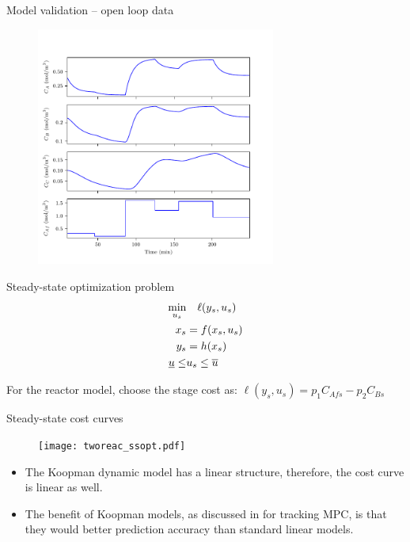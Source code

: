 \documentclass[xcolor=dvipsnames, 8pt]{beamer} %
\begin{document}
\begin{frame}{Model validation -- open loop data}
	\vspace{-0.1in}
	\begin{figure}
		\centering
		\includegraphics[page=1, height=0.8\textheight, 
		width=0.7\textwidth]{tworeac_plots.pdf}
	\end{figure}
\end{frame}

\begin{frame}{Steady-state optimization problem}
	\begin{align*}
	\underset{u_s}{\textnormal{min}} & \quad \ell(y_s, u_s) \\
	x_s &= f(x_s, u_s) \nonumber \\ 
	y_s &= h(x_s) \nonumber \\
	\underline{u} \leq &u_s \leq \overline{u} \nonumber
	\end{align*}
	
	For the reactor model, choose the stage cost as: $\ell(y_s, u_s) = 
	p_1C_{Afs} - p_2C_{Bs}$
	
\end{frame}

\begin{frame}{Steady-state cost curves}
	\begin{figure}
		\centering
		\texttt{[image: tworeac\_ssopt.pdf]}
	\end{figure}

\begin{itemize}
	\item The Koopman dynamic model has a linear structure, therefore, the cost 
	curve is linear as well. 
	\item The benefit of Koopman models, as discussed in 
	\cite{korda:mezic:2018} for tracking MPC, is that they would better 
	prediction accuracy than standard linear models.
\end{itemize}

\end{frame}
\end{document}
